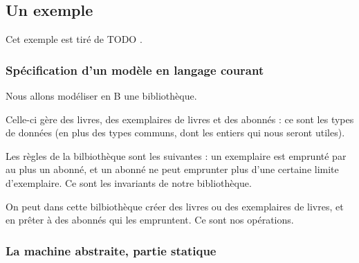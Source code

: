 \documentclass[10pt,a4paper]{article}
\newcommand{\Bequal}{\mathrel{\widehat{=}}}
\begin{document}

\subsection{Un exemple}

Cet exemple est tiré de TODO .


\subsubsection{Spécification d'un modèle en langage courant}

Nous allons modéliser en B une bibliothèque.

Celle-ci gère des livres, des exemplaires de livres et des abonnés : ce sont les types de données (en plus des types communs, dont les entiers qui nous seront utiles).

Les règles de la bilbiothèque sont les suivantes : un exemplaire est emprunté par au plus un abonné, et un abonné ne peut emprunter plus d'une certaine limite d'exemplaire. Ce sont les invariants de notre bibliothèque.

On peut dans cette bilbiothèque créer des livres ou des exemplaires de livres, et en prêter à des abonnés qui les empruntent. Ce sont nos opérations.

\subsubsection{La machine abstraite, partie statique}
\end{document}
